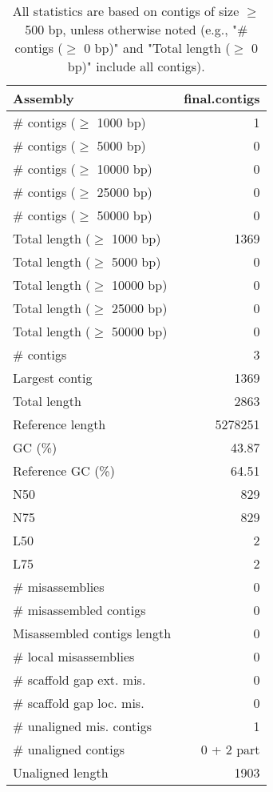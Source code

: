 \documentclass[12pt,a4paper]{article}
\begin{document}
\begin{table}[ht]
\begin{center}
\caption{All statistics are based on contigs of size $\geq$ 500 bp, unless otherwise noted (e.g., "\# contigs ($\geq$ 0 bp)" and "Total length ($\geq$ 0 bp)" include all contigs).}
\begin{tabular}{|l*{1}{|r}|}
\hline
Assembly & final.contigs \\ \hline
\# contigs ($\geq$ 1000 bp) & 1 \\ \hline
\# contigs ($\geq$ 5000 bp) & 0 \\ \hline
\# contigs ($\geq$ 10000 bp) & 0 \\ \hline
\# contigs ($\geq$ 25000 bp) & 0 \\ \hline
\# contigs ($\geq$ 50000 bp) & 0 \\ \hline
Total length ($\geq$ 1000 bp) & 1369 \\ \hline
Total length ($\geq$ 5000 bp) & 0 \\ \hline
Total length ($\geq$ 10000 bp) & 0 \\ \hline
Total length ($\geq$ 25000 bp) & 0 \\ \hline
Total length ($\geq$ 50000 bp) & 0 \\ \hline
\# contigs & 3 \\ \hline
Largest contig & 1369 \\ \hline
Total length & 2863 \\ \hline
Reference length & 5278251 \\ \hline
GC (\%) & 43.87 \\ \hline
Reference GC (\%) & 64.51 \\ \hline
N50 & 829 \\ \hline
N75 & 829 \\ \hline
L50 & 2 \\ \hline
L75 & 2 \\ \hline
\# misassemblies & 0 \\ \hline
\# misassembled contigs & 0 \\ \hline
Misassembled contigs length & 0 \\ \hline
\# local misassemblies & 0 \\ \hline
\# scaffold gap ext. mis. & 0 \\ \hline
\# scaffold gap loc. mis. & 0 \\ \hline
\# unaligned mis. contigs & 1 \\ \hline
\# unaligned contigs & 0 + 2 part \\ \hline
Unaligned length & 1903 \\ \hline

\end{tabular}
\end{center}
\end{table}
\end{document}
